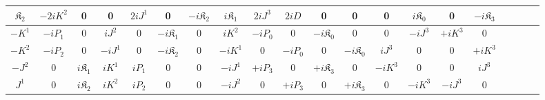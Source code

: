 \documentclass[]{article}
\numberwithin{equation}{section}
\begin{document}
{{\begin{center}
\begin{table}[h!]
{\begin{tabular}{ |c||c|c|c|c|c|c|c|c|c|c|c|c|c|c|c|c|c|c|c| }
 \hline 
 \rule{0pt}{16pt}$\mathfrak{K}_{{2}}$ &$-2i{K}^{{2}}$&0&0&${2i{J}^{{1}}}$&0&$-i\mathfrak{K}_{{2}}$&$i\mathfrak{K}_{{1}}$&$2iJ^{{3}}$&$2iD$&0&0&0&$i\mathfrak{K}_{{0}}$&0&${-i\mathfrak{K}_{{3}}}$\\
 \hline 
 \rule{0pt}{16pt}$-{K}^{{1}}$ &$-iP_{{1}}$&$0$&$i{J}^{{2}}$&$0$&$-i\mathfrak{K}_{{1}}$&0&$i{K}^{{2}}$&$-iP_{{0}}$&0&$-i\mathfrak{K}_{{0}}$&0&0&$-iJ^{{3}}$&${+iK^{{3}}}$&$0$\\
 \hline 
 \rule{0pt}{16pt}$-{K}^{{2}}$ &$-iP_{{2}}$&$0$&$-i{J}^{{1}}$&$0$&$-i\mathfrak{K}_{{2}}$&0&$-i{K}^{{1}}$&0&$-iP_{{0}}$&0&$-i\mathfrak{K}_{{0}}$&$iJ^{{3}}$&0&$0$&${+iK^{{3}}}$\\
 \hline 
 \rule{0pt}{16pt}$-{J}^{{2}}$ &$0$&${i\mathfrak{K}_{{1}}}$&$i{K}^{{1}}$&${iP_{{1}}}$&$0$&0&$-i{J}^{{1}}$&${+iP_{{3}}}$&0&${+i\mathfrak{K}_{{3}}}$&0&${-iK^{{3}}}$&$0$&0&$iJ^{{3}}$\\
 \hline 
 \rule{0pt}{16pt}${J}^{{1}}$ &$0$&${i\mathfrak{K}_{{2}}}$&$i{K}^{{2}}$&${iP_{{2}}}$&$0$&0&$-i{J}^{{2}}$&0&${+iP_{{3}}}$&0&${+i\mathfrak{K}_{{3}}}$&$0$&${-iK^{{3}}}$&$-iJ^{{3}}$&0\\
 \hline 
\end{tabular}}
\end{table}
\end{center}

}}
\end{document}
